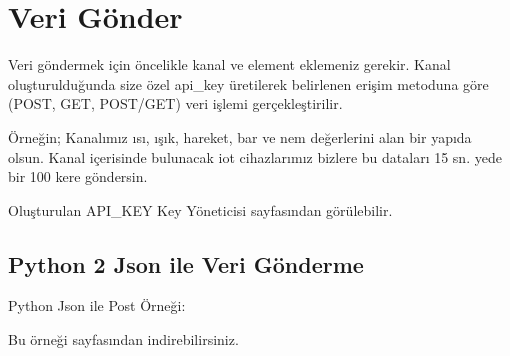 \documentclass[letterpaper,10pt,turkish]{sphinxmanual}
\begin{document}
\section{Veri Gönder}
\label{\detokenize{send-data::doc}}\label{\detokenize{send-data:veri-gonder}}\label{\detokenize{send-data:send-data}}
Veri göndermek için öncelikle kanal ve element eklemeniz gerekir. Kanal oluşturulduğunda
size özel \sphinxquotedblleft{}api\_key\sphinxquotedblright{} üretilerek belirlenen erişim metoduna göre (POST, GET, POST/GET) veri işlemi gerçekleştirilir.

Örneğin; Kanalımız ısı, ışık, hareket, bar ve nem değerlerini alan bir yapıda olsun.
Kanal içerisinde bulunacak iot cihazlarımız bizlere bu dataları 15 sn. yede bir 100 kere göndersin.

Oluşturulan \sphinxquotedblleft{}API\_KEY\sphinxquotedblright{} Key Yöneticisi sayfasından görülebilir.


\subsection{Python 2 Json ile Veri Gönderme}
\label{\detokenize{send-data:python-2-json-ile-veri-gonderme}}
Python Json ile Post Örneği:

Bu örneği  sayfasından indirebilirsiniz.
\end{document}

